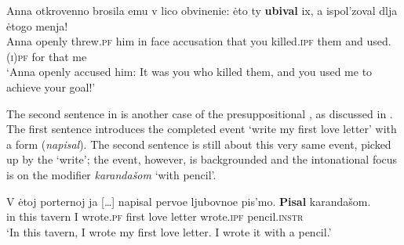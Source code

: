 \documentclass[output=paper,modfonts,newtxmath,hidelinks
\ChapterDOI{10.5281/zenodo.2545513}
]{langscibook}
\begin{document}
\ea\gll	Anna otkrovenno brosila emu v lico obvinenie: \.{e}to ty \textbf{ubival} ix, a ispol'zoval dlja \.{e}togo menja!\\ 						
	Anna openly threw.\textsc{pf} him in face accusation that you killed.\textsc{ipf} them and used.\textsc{(i)pf} for that me\\
\glt	`Anna openly accused him: It was you who killed them, and you used me to achieve your goal!' \hfill \citep[after][131]{gronndiss}\label{Anna}
\z

\noindent The second sentence in  \citep[attributed to][]{forsyth70} is another case of the presuppositional , as discussed in \citet[][192f.]{gronndiss}. The first sentence introduces the completed  event `write my first love letter' with a  form (\textit{napisal}). The second sentence is still about this very same event, picked up by the  `write'; the event, however, is backgrounded and the intonational focus is on the modifier \textit{karandašom} `with pencil'.

\ea\label{love letter} \gll V \.{e}toj porternoj ja [\dots] napisal pervoe ljubovnoe pis'mo. \textbf{Pisal} karandašom.\\
in this tavern I {} wrote.\textsc{pf} first love letter 			 wrote.\textsc{ipf} pencil.\textsc{instr}\\
\glt `In this tavern, I wrote my first love letter. I wrote it with a pencil.'
\z
\end{document}
